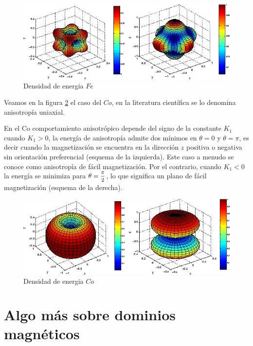 \begin{figure}[H]
    \centering
    \includegraphics[width=1.0\textwidth]{./Figures/densidadEnergia1}
	\caption{Densidad de energia $Fe$}
	\label{fig:densidadEnergia1}
\end{figure}

Veamos en la figura \ref{fig:densidadEnergia2} el caso del $Co$, en la literatura científica se lo denomina anisotropía uniaxial.

En el Co comportamiento anisotrópico depende del signo de la constante $K_{1}$ cuando $K_{1}> 0$, la energía de anisotropía admite dos mínimos en $\theta=0$ y $\theta=\pi$, es decir cuando la magnetización se encuentra en la dirección $z$ positiva o negativa sin orientación preferencial (esquema de la izquierda). Este caso a menudo se conoce como anisotropía de fácil magnetización. Por el contrario, cuando $K_{1}<0$ la energía se minimiza para ${\theta=\mfrac{\pi}{2}}$, lo que significa un plano de fácil magnetización (esquema de la derecha).

\begin{figure}[H]
    \centering
    \includegraphics[width=1.0\textwidth]{./Figures/densidadEnergia2}
	\caption{Densidad de energia $Co$}
	\label{fig:densidadEnergia2}
\end{figure}


\section{Algo más sobre dominios magnéticos}

